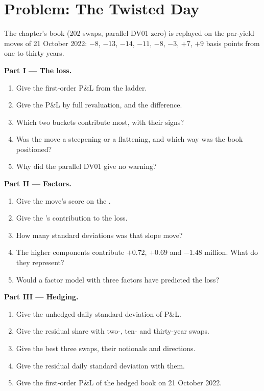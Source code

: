 \section{Problem: The Twisted Day}

\begin{problem}\label{pb:rc:rates-risk:1}
The chapter's book (202 swaps, parallel DV01 zero) is replayed on the par-yield
moves of 21 October 2022: $-8$, $-13$, $-14$, $-11$, $-8$, $-3$, $+7$, $+9$
basis points from one to thirty years.

\medskip\noindent\textbf{Part I --- The loss.}
\begin{enumerate}
\item Give the first-order P\&L from the ladder.
\item Give the P\&L by full revaluation, and the difference.
\item Which two buckets contribute most, with their signs?
\item Was the move a steepening or a flattening, and which way was the book
positioned?
\item Why did the parallel DV01 give no warning?
\end{enumerate}

\medskip\noindent\textbf{Part II --- Factors.}
\begin{enumerate}[resume]
\item Give the move's score on the .
\item Give the 's contribution to the loss.
\item How many standard deviations was that slope move?
\item The higher components contribute $+0.72$, $+0.69$ and $-1.48$ million. What do
they represent?
\item Would a factor model with three factors have predicted the loss?
\end{enumerate}

\medskip\noindent\textbf{Part III --- Hedging.}
\begin{enumerate}[resume]
\item Give the unhedged daily standard deviation of P\&L.
\item Give the residual share with two-, ten- and thirty-year swaps.
\item Give the best three swaps, their notionals and directions.
\item Give the residual daily standard deviation with them.
\item Give the first-order P\&L of the hedged book on 21 October 2022.
\end{enumerate}


\end{problem}
